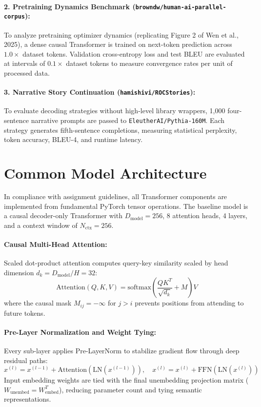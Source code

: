 \documentclass[11pt,a4paper]{article}
\begin{document}
\paragraph{2. Pretraining Dynamics Benchmark (\texttt{browndw/human-ai-parallel-corpus}):}
To analyze pretraining optimizer dynamics (replicating Figure 2 of Wen et al., 2025), a dense causal Transformer is trained on next-token prediction across $1.0\times$ dataset tokens. Validation cross-entropy loss and test BLEU are evaluated at intervals of $0.1\times$ dataset tokens to measure convergence rates per unit of processed data.

\paragraph{3. Narrative Story Continuation (\texttt{hamishivi/ROCStories}):}
To evaluate decoding strategies without high-level library wrappers, 1,000 four-sentence narrative prompts are passed to \texttt{EleutherAI/Pythia-160M}. Each strategy generates fifth-sentence completions, measuring statistical perplexity, token accuracy, BLEU-4, and runtime latency.

\section{Common Model Architecture}

In compliance with assignment guidelines, all Transformer components are implemented from fundamental PyTorch tensor operations. The baseline model is a causal decoder-only Transformer with $D_{\text{model}} = 256$, 8 attention heads, 4 layers, and a context window of $N_{\text{ctx}} = 256$.

\paragraph{Causal Multi-Head Attention:}
Scaled dot-product attention computes query-key similarity scaled by head dimension $d_k = D_{\text{model}} / H = 32$:
\begin{equation}
\text{Attention}(Q, K, V) = \text{softmax}\left(\frac{Q K^T}{\sqrt{d_k}} + M\right) V
\end{equation}
where the causal mask $M_{ij} = -\infty$ for $j > i$ prevents positions from attending to future tokens.

\paragraph{Pre-Layer Normalization and Weight Tying:}
Every sub-layer applies Pre-LayerNorm to stabilize gradient flow through deep residual paths:
\begin{equation}
x^{(l)} = x^{(l-1)} + \text{Attention}(\text{LN}(x^{(l-1)})), \quad x^{(l)} = x^{(l)} + \text{FFN}(\text{LN}(x^{(l)}))
\end{equation}
Input embedding weights are tied with the final unembedding projection matrix ($W_{\text{unembed}} = W_{\text{embed}}^T$), reducing parameter count and tying semantic representations.
\end{document}
